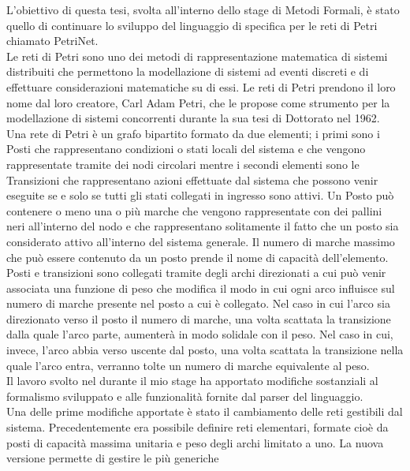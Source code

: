 \documentclass[italian,12pt]{report}
\begin{document}


\onehalfspacing
 L'obiettivo di questa tesi, svolta all'interno dello stage di Metodi Formali,  è stato quello 
 di continuare lo sviluppo del linguaggio di specifica per le reti di Petri chiamato PetriNet. \\
 Le reti di Petri sono uno dei metodi di rappresentazione matematica di sistemi distribuiti 
 che permettono la modellazione di sistemi
 ad eventi discreti e di effettuare considerazioni matematiche su di essi. Le reti di Petri prendono 
 il loro nome dal loro creatore, Carl Adam Petri, che le propose come strumento per la modellazione
 di sistemi concorrenti durante la sua tesi di Dottorato nel 1962. \\
 Una rete di Petri è un grafo bipartito formato da due elementi; i primi sono i Posti che rappresentano 
 condizioni o stati locali del sistema e che vengono rappresentate tramite dei nodi circolari mentre 
 i secondi elementi sono le Transizioni che rappresentano azioni effettuate dal sistema che possono
 venir eseguite se e solo se tutti gli stati collegati in ingresso sono attivi. Un Posto può contenere 
 o meno una o più marche che vengono rappresentate con dei pallini neri all'interno 
 del nodo e che rappresentano solitamente il fatto che un posto sia considerato attivo all'interno
 del sistema generale. Il numero di marche massimo che può essere contenuto da un posto 
 prende il nome di capacità dell'elemento. \\
 Posti e transizioni sono collegati tramite degli archi direzionati a cui può venir associata 
 una funzione di peso che modifica il modo in cui ogni arco influisce sul numero di marche presente
 nel posto a cui è collegato. Nel caso in cui l'arco sia direzionato verso il posto il numero di marche,
 una volta scattata la transizione dalla quale l'arco parte, aumenterà in modo solidale con il peso. 
 Nel caso in cui, invece, l'arco abbia verso uscente dal posto, una volta scattata la transizione nella 
 quale l'arco entra, verranno tolte un numero di marche equivalente al peso. \\
 Il lavoro svolto nel durante il mio stage ha apportato modifiche sostanziali al formalismo 
 sviluppato e alle funzionalità fornite dal parser del linguaggio. \\
 Una delle prime modifiche apportate è stato il cambiamento delle reti gestibili dal sistema. 
 Precedentemente era possibile definire reti elementari, formate cioè da posti di capacità massima 
 unitaria e peso degli archi limitato a uno. La nuova versione permette di gestire le più generiche 
\end{document}
